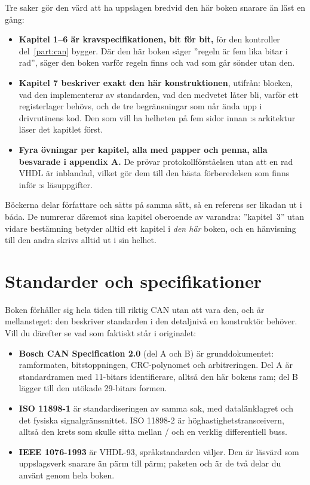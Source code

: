 Tre saker gör den värd att ha uppslagen bredvid den här boken snarare än läst en gång:

\begin{itemize}
  \item \textbf{Kapitel 1--6 är kravspecifikationen, bit för bit,} för den kontroller
    del~\ref{part:can} bygger. Där den här boken säger ”regeln är fem lika bitar i rad”, säger den
    boken varför regeln finns och vad som går sönder utan den.
  \item \textbf{Kapitel 7 beskriver exakt den här konstruktionen}, utifrån: blocken, vad den
    implementerar av standarden, vad den medvetet låter bli, varför ett registerlager behövs, och de
    tre begränsningar som når ända upp i drivrutinens kod. Den som vill ha helheten på fem sidor
    innan :s arkitektur läser det kapitlet först.
  \item \textbf{Fyra övningar per kapitel, alla med papper och penna, alla besvarade i appendix A.}
    De prövar protokollförståelsen utan att en rad VHDL är inblandad, vilket gör dem till den bästa
    förberedelsen som finns inför :s läsuppgifter.
\end{itemize}

Böckerna delar författare och sätts på samma sätt, så en referens ser likadan ut i båda. De numrerar
däremot sina kapitel oberoende av varandra: ”kapitel~3” utan vidare bestämning betyder alltid ett
kapitel i \emph{den här} boken, och en hänvisning till den andra skrivs alltid ut i sin helhet.

\section{Standarder och specifikationer}
\label{app:reading:specs}

Boken förhåller sig hela tiden till riktig CAN utan att vara den, och \canbook{} är mellansteget:
den beskriver standarden i den detaljnivå en konstruktör behöver. Vill du därefter se vad som
faktiskt står i originalet:

\begin{itemize}
  \item \textbf{Bosch CAN Specification 2.0} (del A och B) är grunddokumentet: ramformaten,
    bitstoppningen, CRC-polynomet och arbitreringen. Del A är standardramen med 11-bitars
    identifierare, alltså den här bokens ram; del B lägger till den utökade 29-bitars formen.
  \item \textbf{ISO 11898-1} är standardiseringen av samma sak, med datalänklagret och det fysiska
    signalgränssnittet. ISO 11898-2 är höghastighetstransceivern, alltså den krets som skulle sitta
    mellan / och en verklig differentiell buss.
  \item \textbf{IEEE 1076-1993} är VHDL-93, språkstandarden  väljer. Den är läsvärd
    som uppslagsverk snarare än pärm till pärm; paketen  och
     är de två delar du använt genom hela boken.
\end{itemize}

